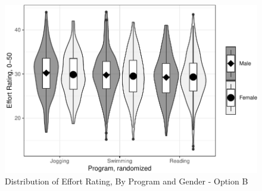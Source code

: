 \documentclass[
]{article}
\begin{document}
\begin{figure}[hb]

\includegraphics{Appendix_ex_weightloss_files/figure-latex/unnamed-chunk-59-1} \hfill{}

\caption{Distribution of Effort Rating, By Program and Gender - Option B}\label{fig:unnamed-chunk-59}
\end{figure}

\clearpage
\end{document}

